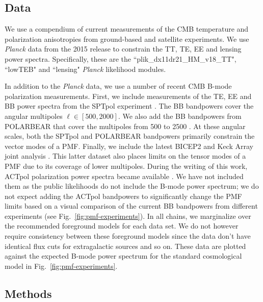 \documentclass[apj]{emulateapj}
\newcommand{\planck}{{\sl Planck}}
\newcommand{\pb}{POLARBEAR}
\newcommand{\sptpol}{SPTpol}
\begin{document}
\subsection{Data}

We use a compendium of current measurements of the CMB temperature and polarization anisotropies from ground-based and satellite experiments. 
We use \planck{} data from the 2015 release to constrain the TT, TE, EE and lensing power spectra. 
Specifically, these are the ``plik\_dx11dr21\_HM\_v18\_TT", ``lowTEB" and ``lensing" \planck{} likelihood modules.


In addition to the \planck{} data, we use a number of recent CMB B-mode polarization measurements. 
First, we include measurements of the TE, EE and BB power spectra from the \sptpol{} experiment \citep{crites15,keisler15}. 
The BB bandpowers cover the angular multipoles $\ell \in [500,2000]$. 
We also add the BB bandpowers from \pb{} that cover the multipoles from 500 to 2500 \citep{polarbear15}. 
At these angular scales, both the \sptpol{} and \pb{} bandpowers primarily constrain the vector modes of a PMF. 
Finally, we include the latest BICEP2 and Keck Array  joint analysis \citep{bicepkeck15}. 
This latter dataset also places limits on the tensor modes of a PMF due to its coverage of lower multipoles. 
During the writing of this work, ACTpol polarization power spectra became available \citep{naess14,louis16}. 
We have not included them as the public likelihoods do not include the B-mode power spectrum; we do not expect adding the ACTpol bandpowers to significantly change the PMF limits based on a visual comparison of the current BB bandpowers from different experiments (see Fig.~\ref{fig:pmf-experiments}).
In all chains, we marginalize over the recommended foreground models for each data set. 
We do not however require consistency between these foreground models since the data don't have identical flux cuts for extragalactic sources and so on. 
These data are plotted against the expected B-mode power spectrum for the standard cosmological model in Fig.~\ref{fig:pmf-experiments}. 

\subsection{Methods}
\end{document}
